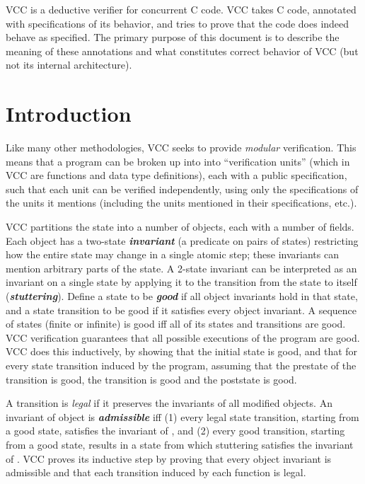 \documentclass[preprint,nocopyrightspace]{sigplanconf}
\newcommand{\Def}[1]{\textit{\textbf{#1}}}
\begin{document}
\ifdense
\renewcommand{\labelitemi}{{\footnotesize \centeroncapheight{$\bullet$}}}
\fi

VCC is a deductive verifier for concurrent C code. VCC takes C code,
annotated with specifications of its behavior, and tries to prove that
the code does indeed behave as specified. The primary purpose of this
document is to describe the meaning of these annotations and what constitutes
correct behavior of VCC (but not its internal architecture). 

\section{Introduction}

Like many other methodologies, VCC seeks to provide \emph{modular}
verification. This means that a program can be broken up into into
``verification units'' (which in VCC are functions and data type
definitions), each with a public specification, such that each unit
can be verified independently, using only the specifications of the
units it mentions (including the units mentioned in their
specifications, etc.). 

VCC partitions the state into a number of objects, each with a number
of fields. Each object has a two-state \Def{invariant} (a predicate on pairs
of states) restricting how the entire state may change in a single
atomic step; these invariants can mention arbitrary parts of the
state. A 2-state invariant can be interpreted as an invariant on a
single state by applying it to the transition from the state to itself
(\Def{stuttering}). Define a state to be \Def{good} if all object
invariants hold in that state, and a state transition to be good if it
satisfies every object invariant. A sequence of states (finite or
infinite) is good iff all of its states and transitions are good. VCC
verification guarantees that all possible executions of the program
are good. VCC does this inductively, by showing that the initial
state is good, and that for every state transition induced by the program,
assuming that the prestate of the transition is good, the transition
is good and the poststate is good.

A transition is \emph{legal} if it preserves the invariants of all
modified objects. An invariant of object  is \Def{admissible}
iff (1) every legal state transition, starting from a good state,
satisfies the invariant of , and (2) every good transition,
starting from a good state, results in a state from which stuttering
satisfies the invariant of . VCC proves its inductive step by
proving that every object invariant is admissible and that each
transition induced by each function is legal.
\end{document}
